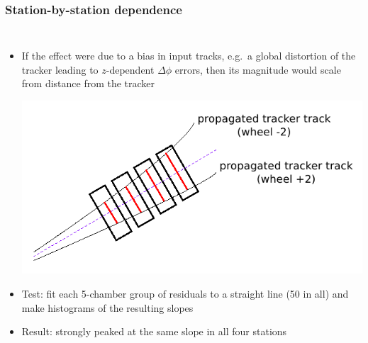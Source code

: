 \documentclass[compress]{beamer}
\begin{document}
\begin{frame}
\frametitle{Station-by-station dependence}
\begin{columns}
\begin{itemize}
\item If the effect were due to a bias in input tracks, e.g.\ a global
distortion of the tracker leading to $z$-dependent $\Delta \phi$
errors, then its magnitude would scale from distance from the tracker

\includegraphics[width=\linewidth]{growth_with_station.png}

\item Test: fit each 5-chamber group of residuals to a straight line
(50 in all) and make histograms of the resulting slopes
\item Result: strongly peaked at the same slope in all four stations
\end{itemize}


\end{columns}
\end{frame}
\end{document}
